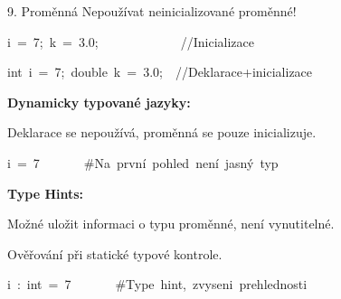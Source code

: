 \documentclass[czech]{beamer}
\newenvironment{lyxcode}
  {\par\begin{list}{}{
    \setlength{\rightmargin}{\leftmargin}
    \setlength{\listparindent}{0pt}%
    \raggedright
    \setlength{\itemsep}{0pt}
    \setlength{\parsep}{0pt}
    \normalfont\ttfamily}%
   \def\{{\char`\{}
   \def\}{\char`\}}
   \def\textasciitilde{\char`\~}
   \item[]}
  {\end{list}}
\begin{document}
\begin{frame}[plain]{9. Proměnná}
{\tiny Nepoužívat neinicializované proměnné!}{\tiny\par}
\begin{lyxcode}
{\tiny i~=~7;~k~=~3.0;~~~~~~~~~~~~~//Inicializace}{\tiny\par}

{\tiny int~i~=~7;~double~k~=~3.0;~~//Deklarace+inicializace}{\tiny\par}

{\tiny\medskip{}
}{\tiny\par}
\end{lyxcode}
{\tiny\textbf{Dynamicky typované jazyky:}}{\tiny\par}

{\tiny Deklarace se nepoužívá, proměnná se pouze inicializuje.}{\tiny\par}
\begin{lyxcode}
{\tiny i~=~7~~~~~~~\#Na~první~pohled~není~jasný~typ}{\tiny\par}
\end{lyxcode}
{\tiny\textbf{Type Hints:}}{\tiny\par}

{\tiny Možné uložit informaci o typu proměnné, není vynutitelné.}{\tiny\par}

{\tiny Ověřování při statické typové kontrole.}{\tiny\par}
\begin{lyxcode}
{\tiny i~:~int~=~7~~~~~~~\#Type~hint,~zvyseni~prehlednosti}{\tiny\par}
\end{lyxcode}
\end{frame}
\end{document}
